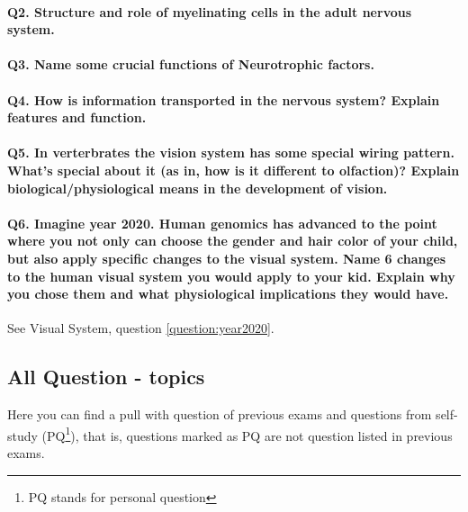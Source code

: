 \documentclass[12pt,article,oneside,a4paper]{memoir}
\begin{document}
\paragraph{Q2. Structure and role of myelinating cells in the adult nervous system.}
\paragraph{Q3. Name some crucial functions of Neurotrophic factors.}
\paragraph{Q4. How is information transported in the nervous system? Explain features and function.}
\paragraph{Q5. In verterbrates the vision system has some special wiring pattern. What's special about it (as in, how is it different to olfaction)? Explain biological/physiological means in the development of vision.}
\paragraph{Q6. Imagine year 2020. Human genomics has advanced to the point where you not only can choose the gender and hair color of your child, but also apply specific changes to the visual system. Name 6 changes to the human visual system you would apply to your kid. Explain why you chose them and what physiological implications they would have.} See Visual System, question \ref{question:year2020}.

\newpage
\subsection{All Question - topics}

Here you can find a pull with question of previous exams and questions from self-study (PQ\footnote{PQ stands for personal question}), that is, questions marked as PQ are not question listed in previous exams.

\end{document}
